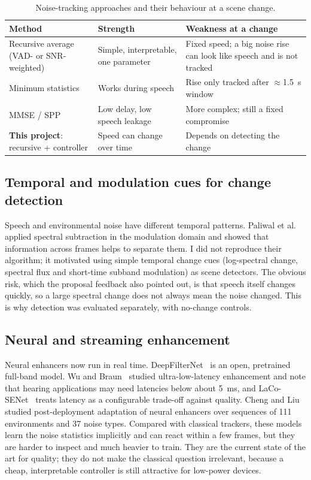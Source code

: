 \documentclass[10pt,conference,a4paper]{IEEEtran}
\begin{document}
\begin{table}[t]
\centering
\caption{Noise-tracking approaches and their behaviour at a scene change.}
\label{tab:tracking}
\footnotesize
\begin{tabular}{@{}p{2.0cm}p{2.7cm}p{2.8cm}@{}}
\toprule
Method & Strength & Weakness at a change\\
\midrule
Recursive average (VAD- or SNR-weighted) & Simple, interpretable, one parameter & Fixed speed; a big noise rise can look like speech and is not tracked\\
Minimum statistics~\cite{martin2001noise} & Works during speech & Rise only tracked after $\approx$1.5~s window\\
MMSE / SPP~\cite{gerkmann2012unbiased} & Low delay, low speech leakage & More complex; still a fixed compromise\\
\textbf{This project}: recursive + controller & Speed can change over time & Depends on detecting the change\\
\bottomrule
\end{tabular}
\end{table}

\subsection{Temporal and modulation cues for change detection}
Speech and environmental noise have different temporal patterns. Paliwal et
al.~\cite{paliwal2009modulation} applied spectral subtraction in the modulation
domain and showed that information across frames helps to separate them. I did
not reproduce their algorithm; it motivated using simple temporal change cues
(log-spectral change, spectral flux and short-time subband modulation) as scene
detectors. The obvious risk, which the proposal feedback also pointed out, is
that speech itself changes quickly, so a large spectral change does not always
mean the noise changed. This is why detection was evaluated separately, with
no-change controls.

\subsection{Neural and streaming enhancement}
Neural enhancers now run in real time. DeepFilterNet~\cite{schroter2023deepfilternet}
is an open, pretrained full-band model. Wu and Braun~\cite{wu2025ultralow}
studied ultra-low-latency enhancement and note that hearing applications may need
latencies below about 5~ms, and LaCo-SENet~\cite{kim2026laco} treats latency as
a configurable trade-off against quality. Cheng and
Liu~\cite{cheng2026lightweight} studied post-deployment adaptation of neural
enhancers over sequences of 111 environments and 37 noise types. Compared with
classical trackers, these models learn the noise statistics implicitly and can
react within a few frames, but they are harder to inspect and much heavier to
train. They are the current state of the art for quality; they do not make the
classical question irrelevant, because a cheap, interpretable controller is still
attractive for low-power devices.
\end{document}

